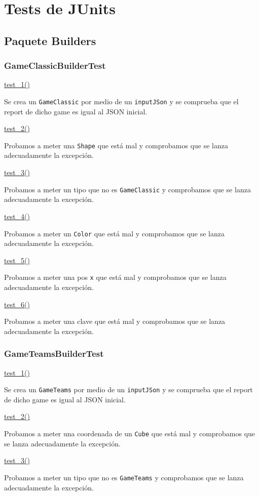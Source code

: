 \documentclass[../DocumentoOficial.tex]{subfiles}
\begin{document}
\chapter{Tests de JUnits}
\section{Paquete Builders}
\subsection{GameClassicBuilderTest}
\underline{test\_1()}

Se crea un \texttt{GameClassic} por medio de un \texttt{inputJSon} y se comprueba que el report de dicho game es igual al JSON inicial.

\underline{test\_2()}

Probamos a meter una \texttt{Shape} que está mal y comprobamos que se lanza adecuadamente la excepción.

\underline{test\_3()}

Probamos a meter un tipo que no es \texttt{GameClassic} y comprobamos que se lanza adecuadamente la excepción.

\underline{test\_4()}

Probamos a meter un \texttt{Color} que está mal y comprobamos que se lanza adecuadamente la excepción.

\underline{test\_5()}

Probamos a meter una pos \texttt{x} que está mal y comprobamos que se lanza adecuadamente la excepción.

\underline{test\_6()}

Probamos a meter una clave que está mal y comprobamos que se lanza adecuadamente la excepción.

\subsection{GameTeamsBuilderTest}
\underline{test\_1()}

Se crea un \texttt{GameTeams} por medio de un \texttt{inputJSon} y se comprueba que el report de dicho game es igual al JSON inicial.

\underline{test\_2()}

Probamos a meter una coordenada de un \texttt{Cube} que está mal y comprobamos que se lanza adecuadamente la excepción.

\underline{test\_3()}

Probamos a meter un tipo que no es \texttt{GameTeams} y comprobamos que se lanza adecuadamente la excepción.
\end{document}
